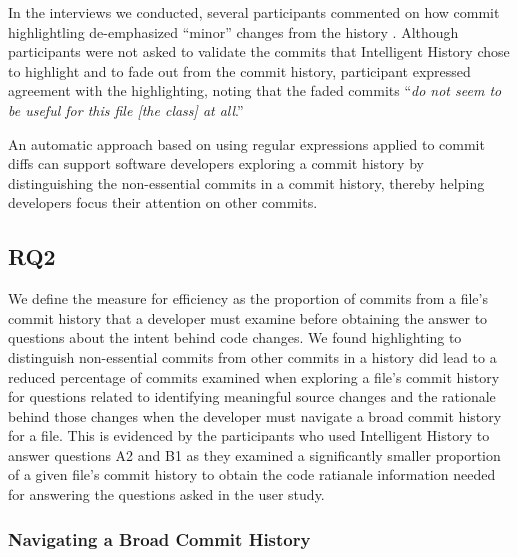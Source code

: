 In the interviews we conducted, 
several participants commented on how commit highlightling de-emphasized ``minor'' changes from the history .
Although participants were not asked to validate the commits that Intelligent History chose to highlight and to fade out from the commit history, 
participant  expressed agreement with the highlighting, 
noting that the faded commits ``\textit{do not seem to be useful for this file [the  class] at all}.''

\begin{summary}[RQ1]
  An automatic approach based on using regular expressions applied to commit diffs 
  can support software developers exploring a commit history 
  by distinguishing the non-essential commits in a commit history,
  thereby helping developers focus their attention on other commits.
\end{summary}


\subsection{RQ2}
\label{subsec:RQ2}


We define the measure for efficiency as the proportion of commits from a file's commit history that a developer must examine before obtaining the answer to questions about the intent behind code changes.
We found highlighting to distinguish non-essential commits from other commits in a history
did lead to a reduced percentage of commits examined when exploring a file's commit history 
for questions related to identifying meaningful source changes 
and the rationale behind those changes when the developer must navigate a broad commit history for a file. 
This is evidenced by the participants who used Intelligent History to answer questions A2 and B1 
as they examined a significantly smaller proportion of a given file's commit history 
to obtain the code ratianale information needed for answering the questions asked in the user study.

\subsubsection{Navigating a Broad Commit History}

